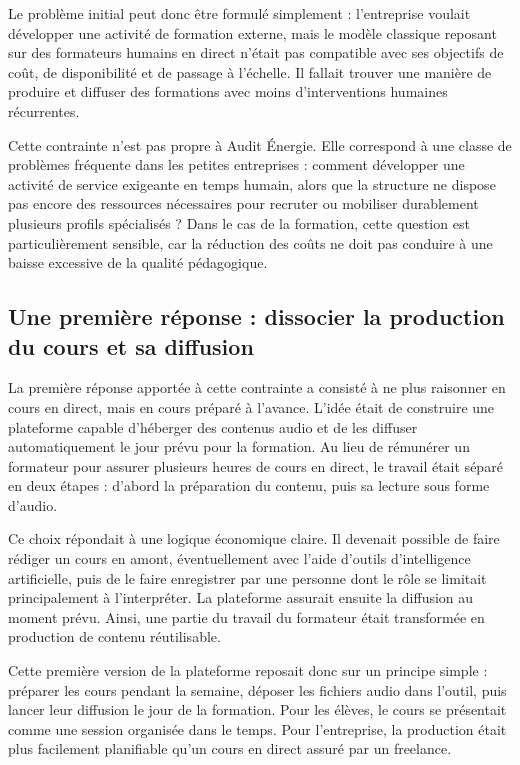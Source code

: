 Le problème initial peut donc être formulé simplement : l'entreprise voulait développer
une activité de formation externe, mais le modèle classique reposant sur des formateurs
humains en direct n'était pas compatible avec ses objectifs de coût, de disponibilité et de
passage à l'échelle. Il fallait trouver une manière de produire et diffuser des formations
avec moins d'interventions humaines récurrentes.

Cette contrainte n'est pas propre à Audit Énergie. Elle correspond à une classe de
problèmes fréquente dans les petites entreprises : comment développer une activité de
service exigeante en temps humain, alors que la structure ne dispose pas encore des
ressources nécessaires pour recruter ou mobiliser durablement plusieurs profils
spécialisés ? Dans le cas de la formation, cette question est particulièrement sensible, car
la réduction des coûts ne doit pas conduire à une baisse excessive de la qualité
pédagogique.

\subsection{Une première réponse : dissocier la production du cours et sa diffusion}

La première réponse apportée à cette contrainte a consisté à ne plus raisonner en cours
en direct, mais en cours préparé à l'avance. L'idée était de construire une plateforme
capable d'héberger des contenus audio et de les diffuser automatiquement le jour prévu
pour la formation. Au lieu de rémunérer un formateur pour assurer plusieurs heures de
cours en direct, le travail était séparé en deux étapes : d'abord la préparation du contenu,
puis sa lecture sous forme d'audio.

Ce choix répondait à une logique économique claire. Il devenait possible de faire rédiger
un cours en amont, éventuellement avec l'aide d'outils d'intelligence artificielle, puis de
le faire enregistrer par une personne dont le rôle se limitait principalement à l'interpréter.
La plateforme assurait ensuite la diffusion au moment prévu. Ainsi, une partie du travail
du formateur était transformée en production de contenu réutilisable.

Cette première version de la plateforme reposait donc sur un principe simple : préparer
les cours pendant la semaine, déposer les fichiers audio dans l'outil, puis lancer leur
diffusion le jour de la formation. Pour les élèves, le cours se présentait comme une
session organisée dans le temps. Pour l'entreprise, la production était plus facilement
planifiable qu'un cours en direct assuré par un freelance.

